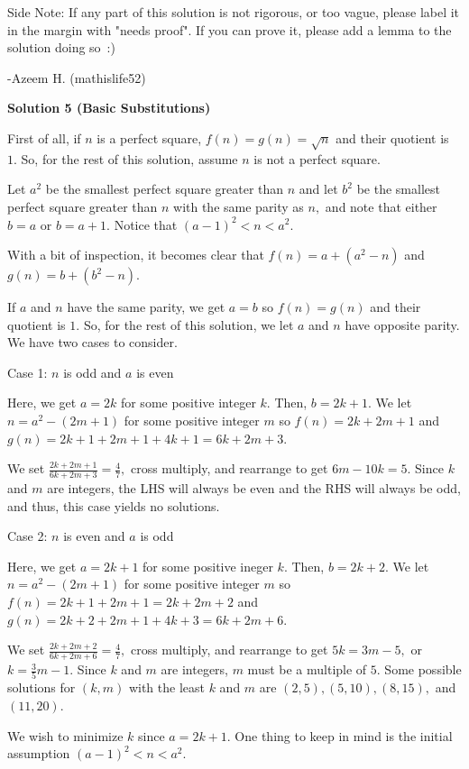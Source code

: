 \begin{enumerate}
 Side Note: If any part of this solution is not rigorous, or too vague, please label it in the margin with "needs proof". If you can prove it, please add a lemma to the solution doing so :)

 -Azeem H. (mathislife52)

 



\textbf{Solution 5 (Basic Substitutions)}

First of all, if $n$ is a perfect square, $f(n)=g(n)=\sqrt{n}$ and their quotient is $1.$ So, for the rest of this solution, assume $n$ is not a perfect square.

 Let $a^2$ be the smallest perfect square greater than $n$ and let $b^2$ be the smallest perfect square greater than $n$ with the same parity as $n,$ and note that either $b=a$ or $b=a+1.$ Notice that $(a-1)^2 < n < a^2.$

 With a bit of inspection, it becomes clear that $f(n) = a+(a^2-n)$ and $g(n) = b+(b^2-n).$

 If $a$ and $n$ have the same parity, we get $a=b$ so $f(n) = g(n)$ and their quotient is $1.$ So, for the rest of this solution, we let $a$ and $n$ have opposite parity. We have two cases to consider.

 Case 1: $n$ is odd and $a$ is even

 Here, we get $a=2k$ for some positive integer $k.$ Then, $b = 2k+1.$ We let $n = a^2-(2m+1)$ for some positive integer $m$ so $f(n) = 2k+2m+1$ and $g(n) = 2k+1+2m+1+4k+1 = 6k+2m+3.$

 We set $\frac{2k+2m+1}{6k+2m+3}=\frac{4}{7},$ cross multiply, and rearrange to get $6m-10k=5.$ Since $k$ and $m$ are integers, the LHS will always be even and the RHS will always be odd, and thus, this case yields no solutions.

 Case 2: $n$ is even and $a$ is odd

 Here, we get $a=2k+1$ for some positive ineger $k.$ Then, $b=2k+2.$ We let $n = a^2-(2m+1)$ for some positive integer $m$ so $f(n)=2k+1+2m+1=2k+2m+2$ and $g(n)=2k+2+2m+1+4k+3 = 6k+2m+6.$

 We set $\frac{2k+2m+2}{6k+2m+6} = \frac{4}{7},$ cross multiply, and rearrange to get $5k=3m-5,$ or $k=\frac{3}{5}m-1.$ Since $k$ and $m$ are integers, $m$ must be a multiple of $5.$ Some possible solutions for $(k,m)$ with the least $k$ and $m$ are $(2,5), (5,10), (8,15),$ and $(11,20).$

 We wish to minimize $k$ since $a=2k+1.$ One thing to keep in mind is the initial assumption $(a-1)^2 < n < a^2.$


\end{enumerate}
